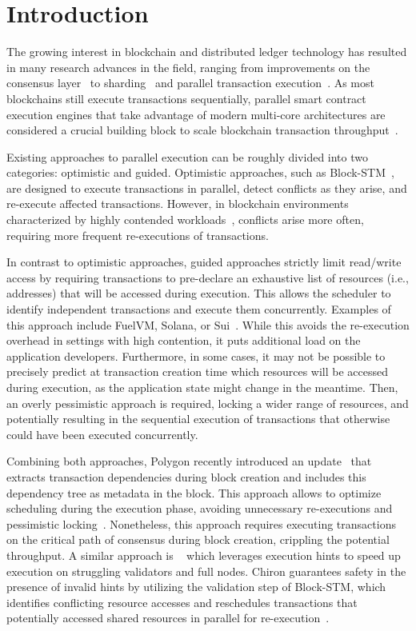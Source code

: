 \section{Introduction}

The growing interest in blockchain and distributed ledger technology has resulted in many research advances in the field, ranging from improvements on the consensus layer~\cite{kauri,narwahl} to sharding~\cite{omniledger} and parallel transaction execution~\cite{blockstm,chiron}. 
As most blockchains still execute transactions sequentially, parallel smart contract execution engines that take advantage of modern multi-core architectures are considered a crucial building block to scale blockchain transaction throughput~\cite{blockstm}.

Existing approaches to parallel execution can be roughly divided into two categories: optimistic and guided. Optimistic approaches, such as Block-STM~\cite{blockstm}, are designed to execute transactions in parallel, detect conflicts as they arise, and re-execute affected transactions. 
However, in blockchain environments characterized by highly contended workloads~\cite{etheng,chiron}, conflicts arise more often, requiring more frequent re-executions of transactions.

In contrast to optimistic approaches, guided approaches strictly limit read/write access by requiring transactions to pre-declare an exhaustive list of resources (i.e., addresses) that will be accessed during execution. This allows the scheduler to identify independent transactions and execute them concurrently. Examples of this approach include FuelVM, Solana, or Sui~\cite{fuelvm,solana,sui}. While this avoids the re-execution overhead in settings with high contention, it puts additional load on the application developers. Furthermore, in some cases, it may not be possible to precisely predict at transaction creation time which resources will be accessed during execution, as the application state might change in the meantime. Then, an overly pessimistic approach is required, locking a wider range of resources, and potentially resulting in the sequential execution of transactions that otherwise could have been executed concurrently.

Combining both approaches, Polygon recently introduced an update~\cite{polygonupdate} that extracts transaction dependencies during block creation and includes this dependency tree as metadata in the block. This approach allows to optimize scheduling during the execution phase, avoiding unnecessary re-executions and pessimistic locking~\cite{polygonupdate}. Nonetheless, this approach requires executing transactions on the critical path of consensus during block creation, crippling the potential throughput.
A similar approach is \basesys~\cite{chiron} which leverages execution hints to speed up execution on struggling validators and full nodes. Chiron guarantees safety in the presence of invalid hints by utilizing the validation step of Block-STM, which identifies conflicting resource accesses and reschedules transactions that potentially accessed shared resources in parallel for re-execution~\cite{blockstm}.


